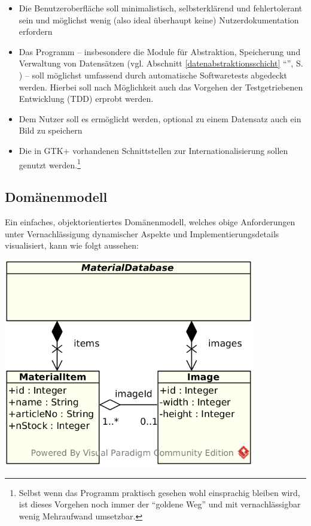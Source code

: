\begin{itemize}
\item Die Benutzeroberfläche soll minimalistisch, selbsterklärend und fehlertolerant sein und möglichst wenig (also
ideal überhaupt keine) Nutzerdokumentation erfordern
\item Das Programm -- insbesondere die Module für Abstraktion, Speicherung und Verwaltung von Datensätzen (vgl.
Abschnitt \ref{datenabstraktionsschicht} ``'', S. \pageref{datenabstraktionsschicht})
-- soll möglichst umfassend durch automatische Softwaretests abgedeckt werden.
Hierbei soll nach Möglichkeit auch das Vorgehen der Testgetriebenen Entwicklung (TDD) erprobt werden.
\item Dem Nutzer soll es ermöglicht werden, optional zu einem Datensatz auch ein Bild zu speichern
\item Die in GTK+ vorhandenen Schnittstellen zur Internationalisierung sollen genutzt werden.\footnote{Selbst wenn das
Programm praktisch gesehen wohl einsprachig bleiben wird, ist dieses Vorgehen noch immer der ``goldene Weg'' und mit
vernachlässigbar wenig Mehraufwand umsetzbar.}
\end{itemize}

\newpage
\subsection{Domänenmodell}
Ein einfaches, objektorientiertes Domänenmodell, welches obige Anforderungen unter Vernachlässigung dynamischer Aspekte
und Implementierungsdetails visualisiert, kann wie folgt aussehen:

\begin{center}
\noindent\includegraphics[width=110mm,keepaspectratio]{images/01-domaenenmodell.png}
\end{center}

